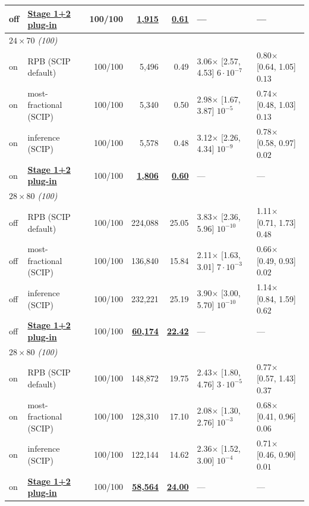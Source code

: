 \begin{table}[t]
\begin{tabular}{llrrrll}
off & \textbf{\underline{Stage 1+2 plug-in}} & 100/100 & \textbf{\underline{1,915}} & \textbf{\underline{0.61}} & --- & --- \\
\midrule
\multicolumn{7}{l}{\emph{$24\times70$ (100)}} \\
on & RPB (SCIP default) & 100/100 & 5,496 & 0.49 & 3.06$\times$ [2.57, 4.53] $6\cdot10^{-7}$ & 0.80$\times$ [0.64, 1.05] $0.13$ \\
on & most-fractional (SCIP) & 100/100 & 5,340 & 0.50 & 2.98$\times$ [1.67, 3.87] $10^{-5}$ & 0.74$\times$ [0.48, 1.03] $0.13$ \\
on & inference (SCIP) & 100/100 & 5,578 & 0.48 & 3.12$\times$ [2.26, 4.34] $10^{-9}$ & 0.78$\times$ [0.58, 0.97] $0.02$ \\
on & \textbf{\underline{Stage 1+2 plug-in}} & 100/100 & \textbf{\underline{1,806}} & \textbf{\underline{0.60}} & --- & --- \\
\midrule
\multicolumn{7}{l}{\emph{$28\times80$ (100)}} \\
off & RPB (SCIP default) & 100/100 & 224,088 & 25.05 & 3.83$\times$ [2.36, 5.96] $10^{-10}$ & 1.11$\times$ [0.71, 1.73] $0.48$ \\
off & most-fractional (SCIP) & 100/100 & 136,840 & 15.84 & 2.11$\times$ [1.63, 3.01] $7\cdot10^{-3}$ & 0.66$\times$ [0.49, 0.93] $0.02$ \\
off & inference (SCIP) & 100/100 & 232,221 & 25.19 & 3.90$\times$ [3.00, 5.70] $10^{-10}$ & 1.14$\times$ [0.84, 1.59] $0.62$ \\
off & \textbf{\underline{Stage 1+2 plug-in}} & 100/100 & \textbf{\underline{60,174}} & \textbf{\underline{22.42}} & --- & --- \\
\midrule
\multicolumn{7}{l}{\emph{$28\times80$ (100)}} \\
on & RPB (SCIP default) & 100/100 & 148,872 & 19.75 & 2.43$\times$ [1.80, 4.76] $3\cdot10^{-5}$ & 0.77$\times$ [0.57, 1.43] $0.37$ \\
on & most-fractional (SCIP) & 100/100 & 128,310 & 17.10 & 2.08$\times$ [1.30, 2.76] $10^{-3}$ & 0.68$\times$ [0.41, 0.96] $0.06$ \\
on & inference (SCIP) & 100/100 & 122,144 & 14.62 & 2.36$\times$ [1.52, 3.00] $10^{-4}$ & 0.71$\times$ [0.46, 0.90] $0.01$ \\
on & \textbf{\underline{Stage 1+2 plug-in}} & 100/100 & \textbf{\underline{58,564}} & \textbf{\underline{24.00}} & --- & --- \\
\bottomrule
\end{tabular}
\end{table}